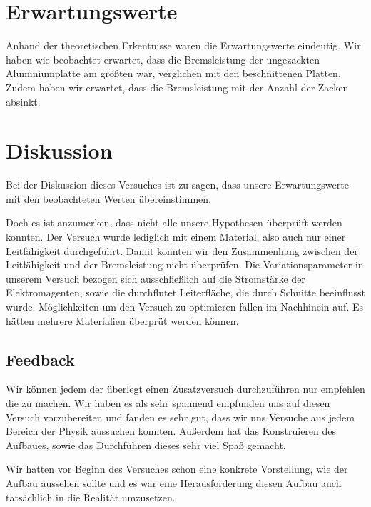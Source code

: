 \section{Erwartungswerte}

Anhand der theoretischen Erkentnisse waren die Erwartungswerte eindeutig.
Wir haben wie beobachtet erwartet, dass die Bremsleistung der
ungezackten Aluminiumplatte am größten war, verglichen mit den
beschnittenen Platten.
Zudem haben wir erwartet, dass die Bremsleistung mit der Anzahl der
Zacken absinkt.

\section{Diskussion}

Bei der Diskussion dieses Versuches ist zu sagen, dass unsere Erwartungswerte
mit den beobachteten Werten übereinstimmen.

Doch es ist anzumerken, dass nicht alle unsere Hypothesen überprüft
werden konnten.
Der Versuch wurde lediglich mit einem Material, also auch nur einer
Leitfähigkeit durchgeführt. Damit konnten wir den Zusammenhang
zwischen der Leitfähigkeit und der Bremsleistung nicht überprüfen.
Die Variationsparameter in unserem Versuch bezogen sich
ausschließlich auf die Stromstärke der Elektromagenten, sowie
die durchflutet Leiterfläche, die durch Schnitte beeinflusst wurde.
Möglichkeiten um den Versuch zu optimieren fallen im Nachhinein auf.
Es hätten mehrere Materialien überprüt werden können.

\subsection{Feedback}

Wir können jedem der überlegt einen Zusatzversuch durchzuführen nur empfehlen
die zu machen. Wir haben es als sehr spannend empfunden  uns auf
diesen Versuch vorzubereiten und fanden es sehr gut, dass
wir uns Versuche aus jedem Bereich der Physik aussuchen konnten.
Außerdem hat das Konstruieren des Aufbaues, sowie das Durchführen dieses
sehr viel Spaß gemacht.

Wir hatten vor Beginn des Versuches schon eine
konkrete Vorstellung, wie der Aufbau aussehen sollte und es war
eine Herausforderung diesen Aufbau auch tatsächlich in die
Realität umzusetzen.


